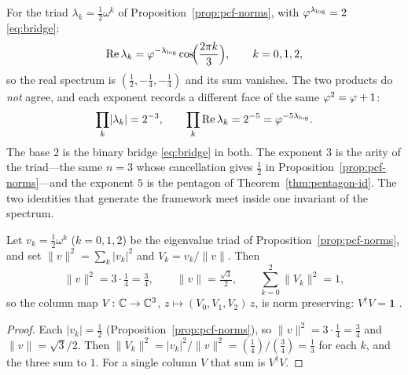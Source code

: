 \begin{proposition}\label{prop:triad-invariants}
For the triad $\lambda_k=\tfrac12\omega^{k}$ of Proposition~\ref{prop:pcf-norms}, with
$\varphi^{\lambda_{\log}}=2$ \eqref{eq:bridge}:
\begin{equation}\label{eq:triad-re}
  \operatorname{Re}\lambda_k=\varphi^{-\lambda_{\log}}\cos\!\Bigl(\frac{2\pi k}{3}\Bigr),\qquad k=0,1,2,
\end{equation}
so the real spectrum is $(\tfrac12,-\tfrac14,-\tfrac14)$ and its sum vanishes. The two products
do \emph{not} agree, and each exponent records a different face of the same
$\varphi^{2}=\varphi+1$:
\begin{equation}\label{eq:triad-products}
  \prod_{k}\lvert\lambda_k\rvert=2^{-3},
  \qquad
  \prod_{k}\operatorname{Re}\lambda_k=2^{-5}=\varphi^{-5\lambda_{\log}}.
\end{equation}
The base $2$ is the binary bridge \eqref{eq:bridge} in both. The exponent $3$ is the arity of the
triad---the same $n{=}3$ whose cancellation gives $\tfrac12$ in
Proposition~\ref{prop:pcf-norms}---and the exponent $5$ is the pentagon of
Theorem~\ref{thm:pentagon-id}. The two identities that generate the framework meet inside one
invariant of the spectrum.

\end{proposition}

\begin{lemma}\label{lem:isometry}
Let $v_k=\tfrac12\omega^{k}$ ($k=0,1,2$) be the eigenvalue triad of
Proposition~\ref{prop:pcf-norms}, and set $\lVert v\rVert^2=\sum_k|v_k|^2$ and
$V_k=v_k/\lVert v\rVert$. Then
\begin{equation}\label{eq:isometry-triad}
  \lVert v\rVert^2=3\cdot\tfrac14=\tfrac34,\qquad \lVert v\rVert=\tfrac{\sqrt3}{2},\qquad
  \sum_{k=0}^{2}\lVert V_k\rVert^2=1,
\end{equation}
so the column map $V\colon\mathbb{C}\to\mathbb{C}^3$, $z\mapsto(V_0,V_1,V_2)\,z$, is norm preserving:
$V^{\dagger}V=\mathbf1$ .
\end{lemma}
\begin{proof}
Each $|v_k|=\tfrac12$ (Proposition~\ref{prop:pcf-norms}), so $\lVert v\rVert^2=3\cdot\tfrac14=\tfrac34$
and $\lVert v\rVert=\sqrt3/2$. Then $\lVert V_k\rVert^2=|v_k|^2/\lVert v\rVert^2=(\tfrac14)/(\tfrac34)=\tfrac13$
for each $k$, and the three sum to $1$. For a single column $V$ that sum is $V^{\dagger}V$.
\end{proof}

